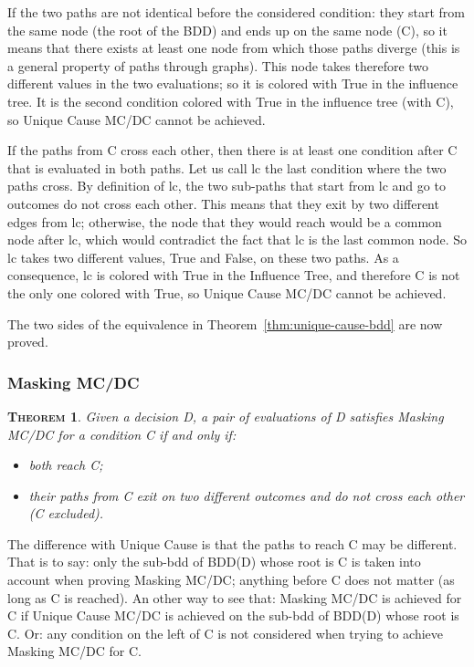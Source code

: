 \documentclass[a4paper,12pt,twoside]{article}
\newtheorem{theorem}{\textsc{Theorem}}
\begin{document}
If the two paths are not identical before the considered condition:
they start from the same node (the root of the BDD) and ends up on
the same node (C), so it means that there exists at least one node
from which those paths diverge (this is a general property of paths
through graphs). This node takes therefore two different values
in the two evaluations; so it is colored with True in the influence
tree. It is the second condition colored with True in the influence
tree (with C), so Unique Cause MC/DC cannot be achieved.

If the paths from C cross each other, then there is at least one
condition after C that is evaluated in both paths. Let us call lc the
last condition where the two paths cross. By definition of lc, the two
sub-paths that start from lc and go to outcomes do not cross each
other. This means that they exit by two different edges from lc;
otherwise, the node that they would reach would be a common node after lc,
which would contradict the fact that lc is the last common node. So
lc takes two different values, True and False, on these two paths.
As a consequence, lc is colored with True in the Influence Tree, and
therefore C is not the only one colored with True, so Unique Cause MC/DC
cannot be achieved.

The two sides of the equivalence in Theorem~\ref{thm:unique-cause-bdd}
are now proved.

\subsubsection{Masking MC/DC}

\begin{theorem}
  \label{thm:masking-bdd}
  Given a decision D, a pair of evaluations of D satisfies
  Masking MC/DC for a condition C if and only if:
  \begin{itemize}
  \item both reach C;
  \item their paths from C exit on two different outcomes and do not cross
  each other (C excluded).
  \end{itemize}
\end{theorem}

The difference with Unique Cause is that the paths to reach C may be
different. That is to say: only the sub-bdd of BDD(D) whose root is C
is taken into account when proving Masking MC/DC; anything before C
does not matter (as long as C is reached). An other way to see that:
Masking MC/DC is achieved for C if Unique Cause MC/DC is achieved on
the sub-bdd of BDD(D) whose root is C. Or: any condition on the left
of C is not considered when trying to achieve Masking MC/DC for C.
\end{document}

